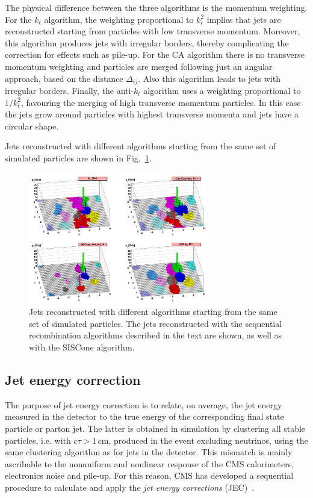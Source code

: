 The physical difference between the three algorithms is the momentum weighting. For the $k_t$ algorithm, the weighting proportional to $k_t^2$ implies that jets are reconstructed starting from particles with low transverse momentum. Moreover, this algorithm produces jets with irregular borders, thereby complicating the correction for effects such as pile-up. For the CA algorithm there is no transverse momentum weighting and particles are merged following just an angular approach, based on the distance $\Delta_{ij}$. Also this algorithm leads to jets with irregular borders. Finally, the anti-$k_t$ algorithm uses a weighting proportional to $1/k_t^2$, favouring the merging of high transverse momentum particles. In this case the jets grow around particles with highest transverse momenta and jets have a circular shape. 

Jets reconstructed with different algorithms starting from the same set of simulated particles are shown in Fig.~\ref{fig:jets}.

\begin{figure}[htb]
\centering
\includegraphics[width=0.7\textwidth]{images/jets.png}
\caption{Jets reconstructed with different algorithms starting from the same set of simulated particles. The jets reconstructed with the sequential recombination algorithms described in the text are shown, as well as with the SISCone algorithm.}\label{fig:jets}
\end{figure}

\subsection{Jet energy correction}\label{sec:jec}

The purpose of jet energy correction is to relate, on average, the jet energy measured in the detector to the true energy of the corresponding final state particle or parton jet. The latter is obtained in simulation by clustering all stable particles, i.e. with $c\tau > 1$\,cm, produced in the event excluding neutrinos, using the same clustering algorithm as for jets in the detector. This mismatch is mainly ascribable to the nonuniform and nonlinear response of the CMS calorimeters, electronics noise and pile-up. For this reason, CMS has developed a sequential procedure to calculate and apply the \emph{jet energy corrections} (JEC)~\cite{Chatrchyan:2011ds}.

